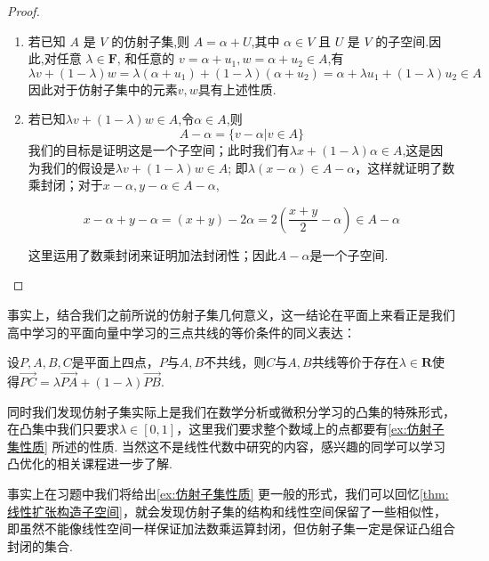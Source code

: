 \begin{proof}
    \begin{enumerate}
        \item 若已知 $A$ 是 $V$ 的仿射子集,则 $A=\alpha+U$,其中 $\alpha\in V$ 且 $U$ 是 $V$ 的子空间.因此,对任意 $\lambda \in \mathbf{F}$,
        和任意的 $v=\alpha+u_1,w=\alpha+u_2 \in A$,有
        \[
            \lambda v+(1-\lambda)w=\lambda(\alpha+u_1)+(1-\lambda)(\alpha+u_2)=\alpha+\lambda u_1+(1-\lambda)u_2 \in A
        \]
        因此对于仿射子集中的元素$v,w$具有上述性质.
        \item 若已知$\lambda v+(1-\lambda)w \in A$,令$\alpha \in A$,则
        \[
            A-\alpha=\{v-\alpha|v\in A\}
        \]
        我们的目标是证明这是一个子空间；此时我们有$\lambda x + (1 - \lambda) \alpha \in A$,这是因为我们的假设是$\lambda v + (1 - \lambda) w \in A$;
        即$\lambda (x-\alpha) \in A- \alpha $，这样就证明了数乘封闭；对于$x-\alpha,y-\alpha \in A-\alpha$,

        \[
           x-\alpha+y-\alpha=(x+y)-2\alpha=2(\dfrac{x+y}{2}-\alpha) \in A-\alpha
        \]

        这里运用了数乘封闭来证明加法封闭性；因此$A-\alpha$是一个子空间.
    \end{enumerate}
\end{proof}

事实上，结合我们之前所说的仿射子集几何意义，这一结论在平面上来看正是我们高中学习的平面向量中学习的三点共线的等价条件的同义表达：
\begin{theorem}{}{}
    设$P,A,B,C$是平面上四点，$P$与$A,B$不共线，则$C$与$A,B$共线等价于存在$\lambda\in\mathbf{R}$使得$\overrightarrow{PC}=\lambda\overrightarrow{PA}+(1-\lambda)\overrightarrow{PB}$.
\end{theorem}
同时我们发现仿射子集实际上是我们在数学分析或微积分学习的凸集的特殊形式，在凸集中我们只要求$\lambda\in[0,1]$，这里我们要求整个数域上的点都要有\autoref{ex:仿射子集性质} 所述的性质. 当然这不是线性代数中研究的内容，感兴趣的同学可以学习凸优化的相关课程进一步了解.

事实上在习题中我们将给出\autoref*{ex:仿射子集性质} 更一般的形式，我们可以回忆\autoref{thm:线性扩张构造子空间}，就会发现仿射子集的结构和线性空间保留了一些相似性，即虽然不能像线性空间一样保证加法数乘运算封闭，但仿射子集一定是保证凸组合封闭的集合.

